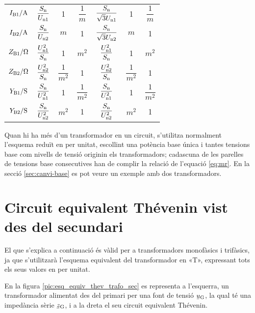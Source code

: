 \begin{ThreePartTable}
\begin{longtable}{ccccccc}
$I\ped{B1}/\unit{A}$ & $\dfrac{S_\mathrm{n}}{U_\mathrm{n1}}$ & 1 & $\dfrac{1}{m}$ & $\dfrac{S_\mathrm{n}}{\sqrt{3}U_\mathrm{n1}}$ & 1  & $\dfrac{1}{m}$\\[0.4cm]
$I\ped{B2}/\unit{A}$ & $\dfrac{S_\mathrm{n}}{U_\mathrm{n2}}$  & $m$ & 1 & $\dfrac{S_\mathrm{n}}{\sqrt{3}U_\mathrm{n2}}$   & $m$ & 1\\[0.4cm]
$Z\ped{B1}/\unit{\ohm}$ & $\dfrac{U_\mathrm{n1}^2}{S_\mathrm{n}}$ & 1 & $m^2$ & $\dfrac{U_\mathrm{n1}^2}{S_\mathrm{n}}$ & 1 & $m^2$\\[0.4cm]
$Z\ped{B2}/\unit{\ohm}$ & $\dfrac{U_\mathrm{n2}^2}{S_\mathrm{n}}$  & $\dfrac{1}{m^2}$ & 1& $\dfrac{U_\mathrm{n2}^2}{S_\mathrm{n}}$  & $\dfrac{1}{m^2}$ & 1\\[0.4cm]
$Y\ped{B1}/\unit{S}$ & $\dfrac{S_\mathrm{n}}{U_\mathrm{n1}^2}$ & 1 & $\dfrac{1}{m^2}$ & $\dfrac{S_\mathrm{n}}{U_\mathrm{n1}^2}$ & 1 & $\dfrac{1}{m^2}$ \\[0.4cm]
$Y\ped{B2}/\unit{S}$ & $\dfrac{S_\mathrm{n}}{U_\mathrm{n2}^2}$  & $m^2$ & 1 & $\dfrac{S_\mathrm{n}}{U_\mathrm{n2}^2}$ &$m^2$ &  1\\[0.4cm]
\bottomrule[1pt]
\end{longtable}
\end{ThreePartTable}


Quan hi ha més d'un transformador en un circuit, s'utilitza normalment l'esquema reduït en per unitat, escollint una potència base única i tantes tensions base com nivells de tensió  originin els transformadors; cadascuna de les parelles de tensions base consecutives han de complir la relació de l'equació \eqref{eq:mr}. En la secció \vref{sec:canvi-base} es pot veure un exemple amb dos transformadors.

\section{Circuit equivalent Thévenin vist des del secundari}\label{sec:trafo-thevenin}

El que s'explica a continuació és vàlid per a transformadors
monofàsics i trifàsics, ja que s'utilitzarà l'esquema equivalent del
transformador en «T», expressant tots els seus valors en per unitat.

En la figura \vref{pic:esq_equiv_thev_trafo_sec}  es representa a
l'esquerra, un transformador alimentat des del primari per una font
de tensió $\cmplx{u}\ped{G}$, la qual té una impedància sèrie
$\cmplx{z}\ped{G}$, i a  la dreta el seu circuit equivalent
Thévenin.

\begin{center}
    
    \label{pic:esq_equiv_thev_trafo_sec}
\end{center}

